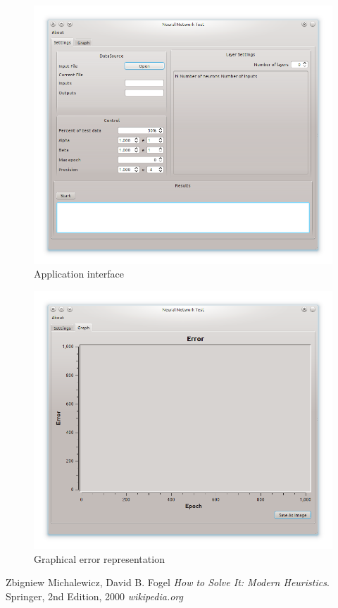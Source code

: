 \documentclass[a4paper,12pt]{article}
\begin{document}
\begin{figure}[!h]
 \centering
 \includegraphics[scale=0.5]{images/interface.png}
 \caption{Application interface}
\end{figure}

\begin{figure}[!h]
 \centering
 \includegraphics[scale=0.5]{images/interface1.png}
 \caption{Graphical error representation}
\end{figure}

\newpage
\newpage

\begin{thebibliography}{9}

  Zbigniew Michalewicz, David B. Fogel
  \emph{How to Solve It: Modern Heuristics}.
  Springer,
  2nd Edition,
  2000
  \emph{wikipedia.org}
\end{thebibliography}
\end{document}
